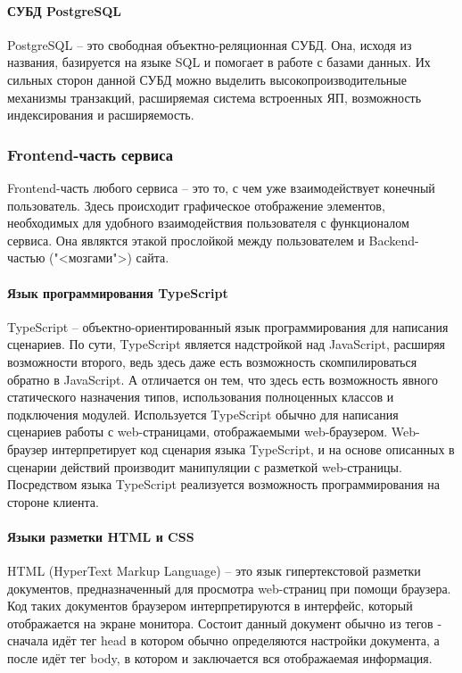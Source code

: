 \paragraph{СУБД PostgreSQL} 

PostgreSQL -- это свободная объектно-реляционная СУБД. Она, исходя из названия, базируется на языке SQL и помогает в работе с базами данных. Их сильных сторон данной СУБД можно выделить высокопроизводительные механизмы транзакций, расширяемая система встроенных ЯП, возможность индексирования и расширяемость. 

\subsubsection{Frontend-часть сервиса}

Frontend-часть любого сервиса -- это то, с чем уже взаимодействует конечный пользователь. Здесь происходит графическое отображение элементов, необходимых для удобного взаимодействия пользователя с функционалом сервиса. Она являктся этакой прослойкой между пользователем и Backend-частью ("<мозгами">) сайта.

\paragraph{Язык программирования TypeScript}

TypeScript – объектно-ориентированный язык программирования для написания сценариев. По сути, TypeScript является надстройкой над JavaScript, расширяя возможности второго, ведь здесь даже есть возможность скомпилироваться обратно в JavaScript. А отличается он тем, что здесь есть возможность явного статического назначения типов, использования полноценных классов и подключения модулей. Используется TypeScript обычно для написания сценариев работы с web-страницами, отображаемыми web-браузером. Web-бра\-у\-зер интерпретирует код сценария языка TypeScript, и на основе описанных в сценарии действий производит манипуляции с разметкой web-страницы. Посредством языка TypeScript реализуется возможность программирования на стороне клиента. 

\paragraph{Языки разметки HTML и CSS}

HTML (HyperText Markup Language) -- это язык гипертекстовой разметки документов, предназначенный для просмотра web-страниц при помощи браузера. Код таких документов браузером интерпретируются в интерфейс, который отображается на экране монитора. Состоит данный документ обычно из тегов - сначала идёт тег head в котором обычно определяются настройки документа, а после идёт тег body, в котором и заключается вся отображаемая информация. 

